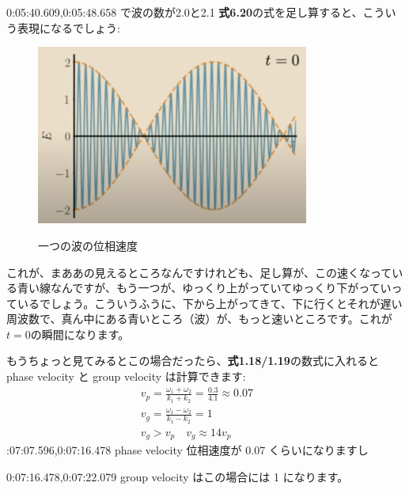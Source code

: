 0:05:40.609,0:05:48.658
で波の数が2.0と2.1
\fi
\textbf{式6.20}の式を足し算すると、こういう表現になるでしょう:
\begin{figure}[H]
   \centering
    \includegraphics[width=0.8\textwidth]{lesson6/t=0.pdf}
    \label{fig: 1}
    \begin{center}
        \caption{一つの波の位相速度}
    \end{center}
\end{figure}

これが、まああの見えるところなんですけれども、足し算が、この速くなっている青い線なんですが、もう一つが、ゆっくり上がっていてゆっくり下がっていっているでしょう。こういうふうに、下から上がってきて、下に行くとそれが遅い周波数で、真ん中にある青いところ（波）が、もっと速いところです。これが$t = 0$の瞬間になります。

もうちょっと見てみるとこの場合だったら、\textbf{式1.18/1.19}の数式に入れるとphase velocity と group velocity は計算できます:
\begin{equation}
\begin{gathered}
v_{p}=\frac{\omega_{1}+\omega_{2}}{k_{1}+k_{2}}=\frac{0.3}{4.1} \approx 0.07 \\
v_{g}=\frac{\omega_{1}-\omega_{2}}{k_{1}-k_{2}}=1 & \begin{array}{l}
\end{array} \\
v_{g}>v_{p} \quad v_{g} \approx 14 v_{p}
\end{gathered}
\end{equation}
:07:07.596,0:07:16.478
phase velocity 位相速度が 0.07 くらいになりますし

0:07:16.478,0:07:22.079
group velocity はこの場合には 1 になります。

